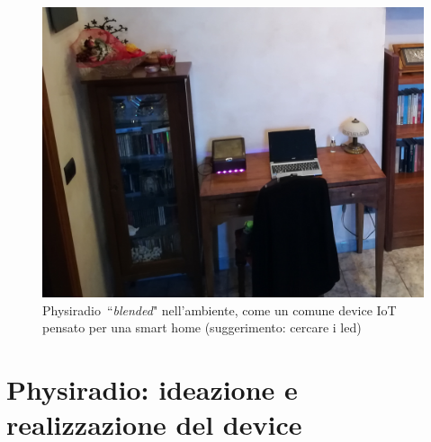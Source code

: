 \documentclass[12pt,a4paper]{report}
\newcommand{\physiradio}{Physiradio} %
\begin{document}
\begin{figure}
	\begin{center}
		\centerline{\includegraphics[width=.99\textwidth]{Immagini/Foto_Physiradio/blended/13.jpg}}
		\caption{\physiradio\ ``\textit{blended}" nell'ambiente, come un comune device IoT pensato per una smart home (suggerimento: cercare i led)}
		\label{fig:blended}
	\end{center}
\end{figure}

%


\chapter{Physiradio: ideazione e realizzazione del device} 
\end{document}
